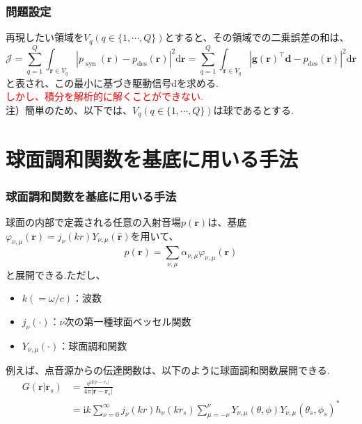 \documentclass[uplatex,dvipdfmx,11pt,notheorems]{beamer}
\theoremstyle{definition}
\begin{document}
 \begin{frame}\frametitle{問題設定}
 再現したい領域を$V_{q}(q \in \{1, \cdots, Q\} )$とすると、その領域での二乗誤差の和は、
 $$\mathcal{J}=\sum_{q=1}^{Q} \int_{\boldsymbol{r} \in V_{q}}\left|p_{\text { syn }}(\boldsymbol{r})-p_{\mathrm{des}}(\boldsymbol{r})\right|^{2} \mathrm{d} \boldsymbol{r}=\sum_{q=1}^{Q} \int_{\boldsymbol{r} \in V_{q}}\left|\boldsymbol{g}(\boldsymbol{r})^{\top} \boldsymbol{d}-p_{\mathrm{des}}(\boldsymbol{r})\right|^{2} \mathrm{d} \boldsymbol{r}$$
と表され、この最小に基づき駆動信号$\mathrm{d}$を求める.\\
\vspace{10mm}
 \textcolor{red}{しかし、積分を解析的に解くことができない.}\\
 \vspace{10mm}
 注）簡単のため、以下では、$V_{q}(q \in \{1, \cdots, Q\} )$は球であるとする.
 \end{frame}

\section{球面調和関数を基底に用いる手法}


 \begin{frame}\frametitle{球面調和関数を基底に用いる手法}
 球面の内部で定義される任意の入射音場$p(\boldsymbol{r})$は、基底$\varphi_{\nu, \mu}(\boldsymbol{r})= j_{\nu}(k r) Y_{\nu, \mu}(\hat{\boldsymbol{r}})$を用いて、
 $$p(\boldsymbol{r})=\sum_{\nu,\mu} \alpha_{\nu,\mu} \varphi_{\nu, \mu}(\boldsymbol{r})$$
と展開できる.ただし、\\
\begin{itemize}
\item $k (= \omega/c)$：波数
\item  $j_{\nu}(\cdot)$：$\nu$次の第一種球面ベッセル関数
\item $Y_{\nu, \mu}(\cdot)$：球面調和関数
 \end{itemize}
例えば、点音源からの伝達関数は、以下のように球面調和関数展開できる.
$$\begin{aligned} G\left(\boldsymbol{r} | \boldsymbol{r}_{s}\right) &=\frac{\mathrm{e}^{\mathrm{i} k\left|r-r_{s}\right|}}{4 \pi\left|\boldsymbol{r}-\boldsymbol{r}_{s}\right|} \\ &=\mathrm{i} k \sum_{\nu=0}^{\infty} j_{\nu}(k r) h_{\nu}\left(k r_{s}\right) \sum_{\mu=-\nu}^{\nu} Y_{\nu,\mu}(\theta, \phi) Y_{\nu,\mu}\left(\theta_{s}, \phi_{s}\right)^{*} \end{aligned}$$

 \end{frame}
\end{document}
